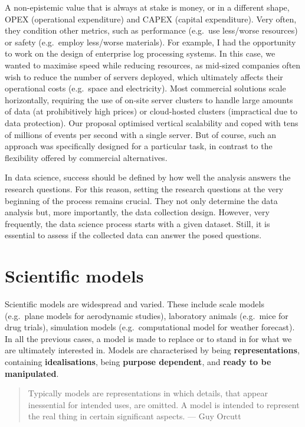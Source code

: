 \documentclass[
]{book}
\begin{document}
A non-epistemic value that is always at stake is money, or in a different shape, OPEX (operational expenditure) and CAPEX (capital expenditure). Very often, they condition other metrics, such as performance (e.g.~use less/worse resources) or safety (e.g.~employ less/worse materials). For example, I had the opportunity to work on the design of enterprise log processing systems. In this case, we wanted to maximise speed while reducing resources, as mid-sized companies often wish to reduce the number of servers deployed, which ultimately affects their operational costs (e.g.~space and electricity). Most commercial solutions scale horizontally, requiring the use of on-site server clusters to handle large amounts of data (at prohibitively high prices) or cloud-hosted clusters (impractical due to data protection). Our proposal optimised vertical scalability and coped with tens of millions of events per second with a single server. But of course, such an approach was specifically designed for a particular task, in contrast to the flexibility offered by commercial alternatives.

In data science, success should be defined by how well the analysis answers the research questions. For this reason, setting the research questions at the very beginning of the process remains crucial. They not only determine the data analysis but, more importantly, the data collection design. However, very frequently, the data science process starts with a given dataset. Still, it is essential to assess if the collected data can answer the posed questions.

\hypertarget{scientific-models}{%
\section{Scientific models}\label{scientific-models}}

Scientific models are widespread and varied. These include scale models (e.g.~plane models for aerodynamic studies), laboratory animals (e.g.~mice for drug trials), simulation models (e.g.~computational model for weather forecast). In all the previous cases, a model is made to replace or to stand in for what we are ultimately interested in. Models are characterised by being \textbf{representations}, containing \textbf{idealisations}, being \textbf{purpose dependent}, and \textbf{ready to be manipulated}.

\begin{quote}
Typically models are representations in which details, that appear inessential for intended uses, are omitted. A model is intended to represent the real thing in certain significant aspects. --- Guy Orcutt
\end{quote}
\end{document}
